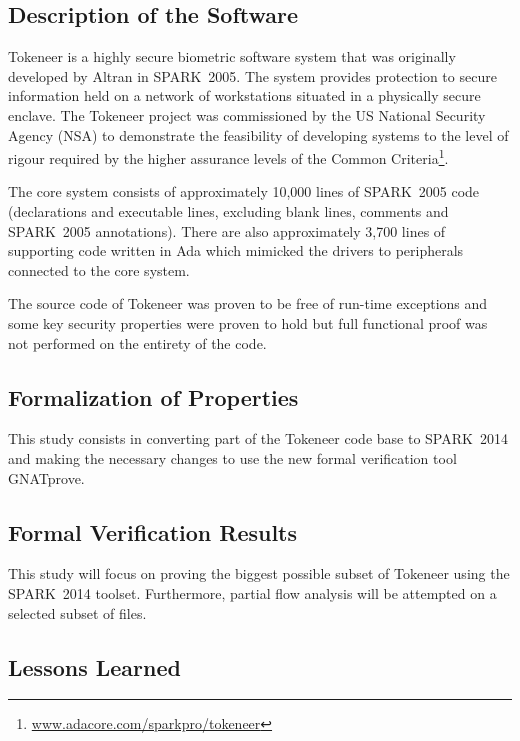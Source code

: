 \documentclass[10pt,a4paper,twocolumn]{article}
\newcommand{\gnatprove}{GNATprove\xspace}
\newcommand{\oldspark}{SPARK~2005\xspace}
\newcommand{\newspark}{SPARK~2014\xspace}
\begin{document}

\subsection{Description of the Software}

Tokeneer is a highly secure biometric software system that was originally
developed by Altran in \oldspark. The system provides protection to secure
information held on a network of workstations situated in a physically
secure enclave. The Tokeneer project was commissioned by the US National
Security Agency (NSA) to demonstrate the feasibility of developing systems
to the level of rigour required by the higher assurance levels of the
Common Criteria\footnote{\url{www.adacore.com/sparkpro/tokeneer}}.

The core system consists of approximately 10,000 lines of \oldspark code
(declarations and executable lines, excluding blank lines, comments and
\oldspark annotations). There are also approximately 3,700 lines of supporting
code written in Ada which mimicked the drivers to peripherals connected
to the core system.


The source code of Tokeneer was proven to be free of run-time exceptions
and some key security properties were proven to hold but full functional
proof was not performed on the entirety of the code.

\subsection{Formalization of Properties}

This study consists in converting part of the Tokeneer code base to \newspark
and making the necessary changes to use the new formal verification tool
\gnatprove.

\subsection{Formal Verification Results}

This study will focus on proving the biggest possible subset of Tokeneer using
the \newspark toolset. Furthermore, partial flow analysis will be attempted on
a selected subset of files.

\subsection{Lessons Learned}
\end{document}
